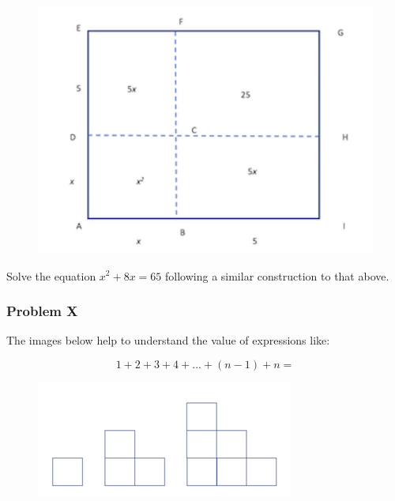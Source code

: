 \documentclass[11pt]{article}
\makeatletter
\def\maxwidth{\ifdim\Gin@nat@width>\linewidth\linewidth
    \else\Gin@nat@width\fi}
\let\Oldincludegraphics\includegraphics
\renewcommand{\includegraphics}[1]{\Oldincludegraphics[width=.8\maxwidth]{#1}}
\makeatother
\begin{document}
\begin{figure}
\centering
\includegraphics{images/section_I/p5.png}
\caption{}
\end{figure}

Solve the equation \(x^2 + 8x = 65\) following a similar construction to
that above.

    \subsubsection{Problem X}\label{problem-x}

The images below help to understand the value of expressions like:

\[ 1 + 2 + 3 + 4 + ... + (n-1) + n = \]

\begin{figure}
\centering
\includegraphics{images/section_I/p6.png}
\caption{}
\end{figure}
\end{document}
